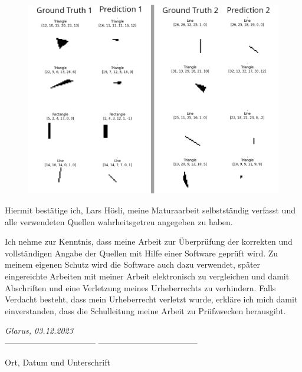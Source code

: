 \documentclass[12pt, a4paper, titlepage]{report}
\begin{document}
\begin{figure}[H]
   \includegraphics[width=1.0\textwidth]{../rc/images/all_shapes_approx_visual3_condensed.png}
   \label{fig:results_demonstration3}
\end{figure}




\pagebreak

Hiermit bestätige ich, Lars Hösli, meine Maturaarbeit selbstständig verfasst
und alle verwendeten Quellen wahrheitsgetreu angegeben zu haben.

Ich nehme zur Kenntnis, dass meine Arbeit zur Überprüfung der korrekten und
vollständigen Angabe der Quellen mit Hilfe einer Software geprüft wird. Zu meinem
eigenen Schutz wird die Software auch dazu verwendet, später eingereichte Arbeiten mit meiner Arbeit elektronisch zu vergleichen und damit Abschriften und
eine Verletzung meines Urheberrechts zu verhindern. Falls Verdacht besteht, dass
mein Urheberrecht verletzt wurde, erkläre ich mich damit einverstanden, dass die
Schulleitung meine Arbeit zu Prüfzwecken herausgibt.

\vspace{2.0cm}
\emph{Glarus, 03.12.2023}\\
--------------------------------- ------------------------------------

Ort, Datum und Unterschrift

\end{document}
